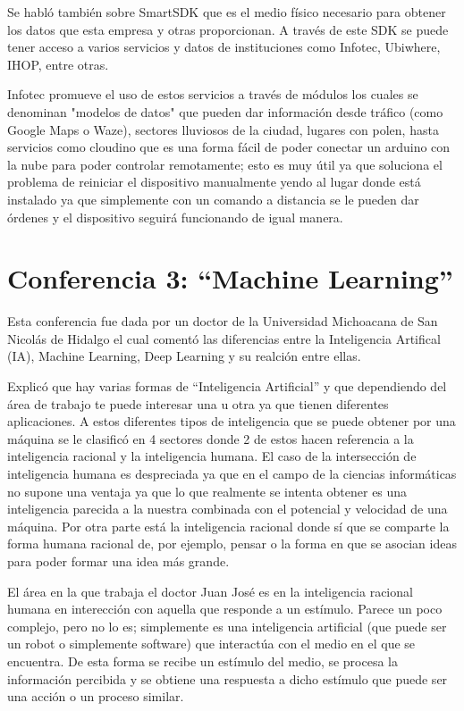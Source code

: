 \documentclass{article}
\begin{document}
Se habló también sobre SmartSDK que es el medio físico necesario para obtener los datos que esta empresa y otras proporcionan.
A través de este SDK se puede tener acceso a varios servicios y datos de instituciones como Infotec, Ubiwhere, IHOP, entre otras.

Infotec promueve el uso de estos servicios a través de módulos los cuales se denominan "modelos de datos" que pueden dar información desde tráfico (como Google Maps o Waze), sectores lluviosos de la ciudad, lugares con polen, hasta servicios como  cloudino que es una forma fácil de poder conectar un arduino con la nube para poder controlar remotamente; esto es muy útil ya que soluciona el problema de reiniciar el dispositivo manualmente yendo al lugar donde está instalado ya que simplemente con un comando a distancia se le pueden dar órdenes y el dispositivo seguirá funcionando de igual manera.

\section{Conferencia 3: ``Machine Learning''}
Esta conferencia fue dada por un doctor de la Universidad Michoacana de San Nicolás de Hidalgo el cual comentó las diferencias entre la Inteligencia Artifical (IA), Machine Learning, Deep Learning y su realción entre ellas.

Explicó que hay varias formas de ``Inteligencia Artificial'' y que dependiendo del área de trabajo te puede interesar una u otra ya que tienen diferentes aplicaciones.
A estos diferentes tipos de inteligencia que se puede obtener por una máquina se le clasificó en 4 sectores donde 2 de estos hacen referencia a la inteligencia racional y la inteligencia humana. El caso de la intersección de inteligencia humana es despreciada ya que en el campo de la ciencias informáticas no supone una ventaja ya que lo que realmente se intenta obtener es una inteligencia parecida a la nuestra combinada con el potencial y velocidad de una máquina. Por otra parte está la inteligencia racional donde sí que se comparte la forma humana racional de, por ejemplo, pensar o la forma en que se asocian ideas para poder formar una idea más grande.

El área en la que trabaja el doctor Juan José es en la inteligencia racional humana en interección con aquella que responde a un estímulo. Parece un poco complejo, pero no lo es; simplemente es una inteligencia artificial (que puede ser un robot o simplemente software) que interactúa con el medio en el que se encuentra. De esta forma se recibe un estímulo del medio, se procesa la información percibida y se obtiene una respuesta a dicho estímulo que puede ser una acción o un proceso similar.
\end{document}
